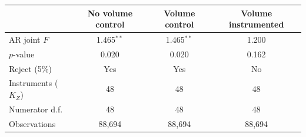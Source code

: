 \begin{tabular}{@{}lccc@{}}
\toprule
& No volume control & Volume control & Volume instrumented \\
\midrule
AR joint $F$ & 1.465$^{**}$ & 1.465$^{**}$ & 1.200 \\
$p$-value & 0.020 & 0.020 & 0.162 \\
Reject (5\%) & Yes & Yes & No \\
\midrule
Instruments ($K_Z$) & 48 & 48 & 48 \\
Numerator d.f. & 48 & 48 & 48 \\
Observations & 88,694 & 88,694 & 88,694 \\
\bottomrule
\end{tabular}
